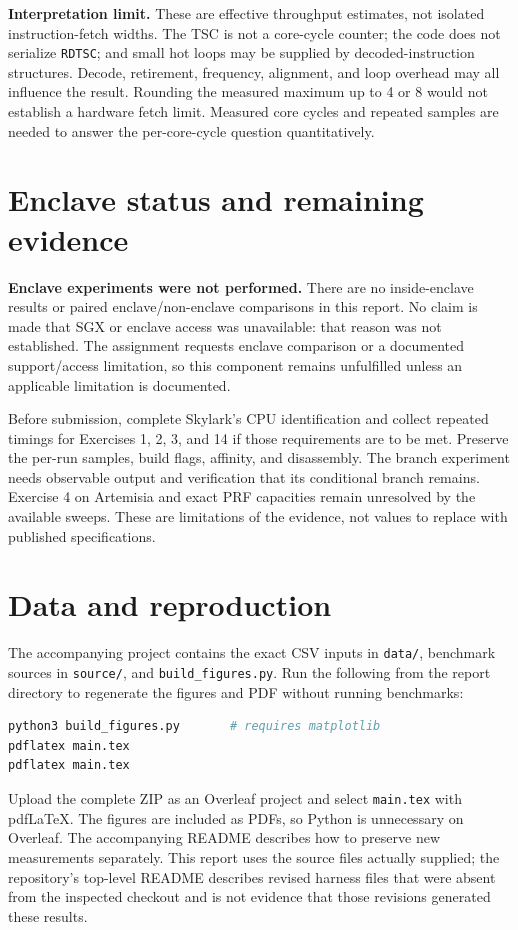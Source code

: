 \documentclass[11pt]{article}
\begin{document}
\textbf{Interpretation limit.} These are effective throughput estimates, not isolated instruction-fetch widths. The TSC is not a core-cycle counter; the code does not serialize \texttt{RDTSC}; and small hot loops may be supplied by decoded-instruction structures. Decode, retirement, frequency, alignment, and loop overhead may all influence the result. Rounding the measured maximum up to 4 or 8 would not establish a hardware fetch limit. Measured core cycles and repeated samples are needed to answer the per-core-cycle question quantitatively.

\section{Enclave status and remaining evidence}
\textbf{Enclave experiments were not performed.} There are no inside-enclave results or paired enclave/non-enclave comparisons in this report. No claim is made that SGX or enclave access was unavailable: that reason was not established. The assignment requests enclave comparison or a documented support/access limitation, so this component remains unfulfilled unless an applicable limitation is documented.

Before submission, complete Skylark's CPU identification and collect repeated timings for Exercises 1, 2, 3, and 14 if those requirements are to be met. Preserve the per-run samples, build flags, affinity, and disassembly. The branch experiment needs observable output and verification that its conditional branch remains. Exercise 4 on Artemisia and exact PRF capacities remain unresolved by the available sweeps. These are limitations of the evidence, not values to replace with published specifications.

\section{Data and reproduction}
The accompanying project contains the exact CSV inputs in \texttt{data/}, benchmark sources in \texttt{source/}, and \texttt{build\_figures.py}. Run the following from the report directory to regenerate the figures and PDF without running benchmarks:
\begin{lstlisting}[language=bash]
python3 build_figures.py       # requires matplotlib
pdflatex main.tex
pdflatex main.tex
\end{lstlisting}
Upload the complete ZIP as an Overleaf project and select \texttt{main.tex} with pdfLaTeX. The figures are included as PDFs, so Python is unnecessary on Overleaf. The accompanying README describes how to preserve new measurements separately. This report uses the source files actually supplied; the repository's top-level README describes revised harness files that were absent from the inspected checkout and is not evidence that those revisions generated these results.
\end{document}

